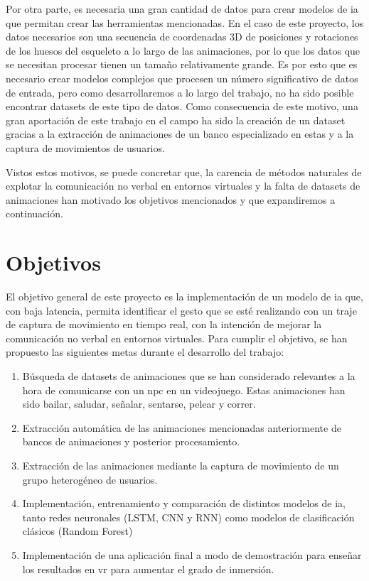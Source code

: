 Por otra parte, es necesaria una gran cantidad de datos para crear modelos de \gls{ia} que permitan crear las herramientas mencionadas.
En el caso de este proyecto, los datos necesarios son una secuencia de coordenadas 3D de posiciones y rotaciones de los huesos del esqueleto a lo largo de las animaciones, por lo que los datos que se necesitan procesar tienen un tamaño relativamente grande.
Es por esto que es necesario crear modelos complejos que procesen un número significativo de datos de entrada, pero como desarrollaremos a lo largo del trabajo, no ha sido posible encontrar datasets de este tipo de datos.
Como consecuencia de este motivo, una gran aportación de este trabajo en el campo ha sido la creación de un dataset gracias a la extracción de animaciones de un banco especializado en estas y a la captura de movimientos de usuarios.

Vistos estos motivos, se puede concretar que, la carencia de métodos naturales de explotar la comunicación no verbal en entornos virtuales y la falta de datasets de animaciones han motivado los objetivos mencionados y que expandiremos a continuación.
\section{Objetivos}

El objetivo general de este proyecto es la implementación de un modelo de \gls{ia} que, con baja latencia, permita identificar el gesto que se esté realizando con un traje de captura de movimiento en tiempo real, con la intención de mejorar la comunicación no verbal en entornos virtuales.
Para cumplir el objetivo, se han propuesto las siguientes metas durante el desarrollo del trabajo:
\begin{enumerate}
	\item Búsqueda de datasets de animaciones que se han considerado relevantes a la hora de comunicarse con un \gls{npc} en un videojuego. Estas animaciones han sido bailar, saludar, señalar, sentarse, pelear y correr.
	\item Extracción automática de las animaciones mencionadas anteriormente de bancos de animaciones y posterior procesamiento.
	\item Extracción de las animaciones mediante la captura de movimiento de un grupo heterogéneo de usuarios.
	\item Implementación, entrenamiento y comparación de distintos modelos de \gls{ia}, tanto redes neuronales (LSTM, CNN y RNN) como modelos de clasificación clásicos (Random Forest)
	\item Implementación de una aplicación final a modo de demostración para enseñar los resultados en \gls{vr} para aumentar el grado de inmersión.
\end{enumerate}

